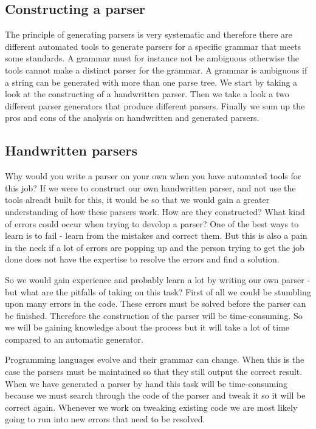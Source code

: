 \subsection{Constructing a parser}
\label{sec:ana-parsers}
The principle of generating parsers is very systematic and therefore there are different automated tools to generate parsers for a specific grammar that meets some standards. A grammar must for instance not be ambiguous otherwise the tools cannot make a distinct parser for the grammar. A grammar is ambiguous if a string can be generated with more than one parse tree. We start by taking a look at the constructing of a handwritten parser. Then we take a look a two different parser generators that produce different parsers. Finally we sum up the pros and cons of the analysis on handwritten and generated parsers. 

\subsection{Handwritten parsers}
\label{sec:handparser}
Why would you write a parser on your own when you have automated tools for this job? If we were to construct our own handwritten parser, and not use the tools alreadt built for this, it would be so that we would gain a greater understanding of how these parsers work. How are they constructed? What kind of errors could occur when trying to develop a parser? One of the best ways to learn is to fail - learn from the mistakes and correct them. But this is also a pain in the neck if a lot of errors are popping up and the person trying to get the job done does not have the expertise to resolve the errors and find a solution.

So we would gain experience and probably learn a lot by writing our own parser - but what are the pitfalls of taking on this task? First of all we could be stumbling upon many errors in the code. These errors must be solved before the parser can be finished. Therefore the construction of the parser will be time-consuming. So we will be gaining knowledge about the process but it will take a lot of time compared to an automatic generator.

Programming languages evolve and their grammar can change. When this is the case the parsers must be maintained so that they still output the correct result. When we have generated a parser by hand this task will be time-consuming because we must search through the code of the parser and tweak it so it will be correct again. Whenever we work on tweaking existing code we are most likely going to run into new errors that need to be resolved. 

